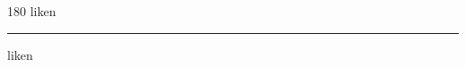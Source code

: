 
\begin{frame}
\begin{center}
\begin{turn}{180}
{\fontsize{2.5cm}{1em}\selectfont liken}
\end{turn}
\vspace{1em}\par  
\hrule
\vspace{1em}\par  
{\fontsize{2.5cm}{1em}\selectfont liken}
\end{center}
\end{frame}

